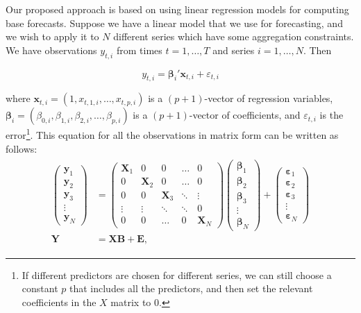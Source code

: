 \documentclass[11pt,a4paper,]{article}
\begin{document}
Our proposed approach is based on using linear regression models for computing base forecasts. Suppose we have a linear model that we use for forecasting, and we wish to apply it to \(N\) different series which have some aggregation constraints. We have observations \(y_{t,i}\) from times \(t=1,\dots,T\) and series \(i=1,\dots,N\). Then

\begin{equation}
\label{eq:basicequation}
  y_{t,i} = \bm{\beta}_{i}' \bm{x}_{t,i} + \varepsilon_{t,i}
\end{equation}

where \(\bm{x}_{t,i}= (1, x_{t,1,i},\dots,x_{t,p,i})\) is a \((p+1)\)-vector of regression variables, \({\bm{\beta}}_i = (\beta_{0,i}, \beta_{1,i}, \beta_{2,i}, \dots, \beta_{p,i})\) is a \((p+1)\)-vector of coefficients, and \({\varepsilon}_{t,i}\) is the error\footnote{If different predictors are chosen for different series, we can still choose a constant \(p\) that includes all the predictors, and then set the relevant coefficients in the \(X\) matrix to \(0\).}. This equation for all the observations in matrix form can be written as follows:
\begin{align}\label{eq:linearmodel}
\begin{split}
  \begin{pmatrix}
  \bm{y}_1\\
  \bm{y}_2\\
  \bm{y}_3 \\
  \vdots\\
  \bm{y}_N
  \end{pmatrix}&=
  \begin{pmatrix}
  \bm{X}_1 & 0        & 0        & \dots  & 0\\
  0        & \bm{X}_2 & 0        & \dots  & 0\\
  0        & 0        & \bm{X}_3 & \ddots & \vdots \\
  \vdots   & \vdots   & \ddots   & \ddots & 0\\
  0        & 0        & \dots    & 0      & \bm{X}_N
  \end{pmatrix}
  \begin{pmatrix}
  \bm{\beta}_1\\
  \bm{\beta}_2\\
  \bm{\beta}_3\\
  \vdots\\
  \bm{\beta}_N
  \end{pmatrix}+
  \begin{pmatrix}
  \bm{\varepsilon}_1\\
  \bm{\varepsilon}_2\\
  \bm{\varepsilon}_3\\
  \vdots \\
  \bm{\varepsilon}_N
  \end{pmatrix}
  \\[2ex]
  \bm{Y} &= \bm{XB} + \bm{E},
\end{split}
\end{align}
\end{document}
